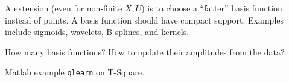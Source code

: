 \medskip\noindent
A extension (even for non-finite $X,U$) is to choose a ``fatter'' basis function instead of points. A basis function should have compact support. Examples include sigmoids, wavelets, B-splines, and kernels.

How many basis functions? How to update their amplitudes from the data?

Matlab example \texttt{qlearn} on T-Square.


